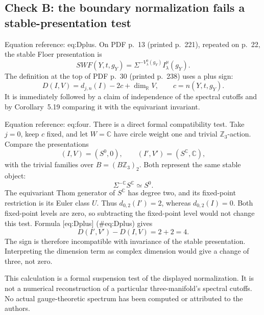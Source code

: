 \documentclass[10pt]{article}
\begin{document}
\subsection*{Check B: the boundary normalization fails a stable-presentation test}
Equation reference: eq:Dplus. On PDF p. 13 (printed p. 221), repeated on p. 22, the stable Floer presentation is \[SWF(Y,t,g_Y)=\Sigma^{-V_\lambda^0(g_Y)}I_\lambda^\mu(g_Y).\] The definition at the top of PDF p. 30 (printed p. 238) uses a plus sign: \[
 D(I,V)=d_{j,n}(I)-2c+\dim_{\mathbb R}V,
 \qquad c=n(Y,t,g_Y).\] It is immediately followed by a claim of independence of the spectral cutoffs and by Corollary 5.19 comparing it with the equivariant invariant.\par
Equation reference: eq:four. There is a direct formal compatibility test. Take \(j=0\), keep \(c\) fixed, and let \(W=\mathbb C\) have circle weight one and trivial \(\mathbb Z_3\)-action. Compare the presentations \[(I,V)=(S^0,0),\qquad (I',V')=(S^{\mathbb C},\mathbb C),\] with the trivial families over \(B=(B\mathbb Z_3)_2\). Both represent the same stable object: \[\Sigma^{-\mathbb C}S^\mathbb C\simeq S^0.\] The equivariant Thom generator of \(S^\mathbb C\) has degree two, and its fixed-point restriction is its Euler class \(U\). Thus \(d_{0,2}(I')=2\), whereas \(d_{0,2}(I)=0\). Both fixed-point levels are zero, so subtracting the fixed-point level would not change this test. Formula [eq:Dplus] (\#eq:Dplus) gives \[
 D(I',V')-D(I,V)=2+2=4.\] The sign is therefore incompatible with invariance of the stable presentation. Interpreting the dimension term as complex dimension would give a change of three, not zero.\par
This calculation is a formal suspension test of the displayed normalization. It is not a numerical reconstruction of a particular three-manifold’s spectral cutoffs. No actual gauge-theoretic spectrum has been computed or attributed to the authors.\par
\end{document}
